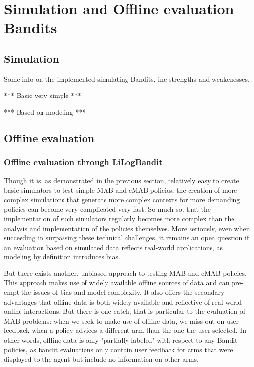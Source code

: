 \documentclass[nojss]{jss}\usepackage[]{graphicx}\usepackage[]{color}
\begin{document}
\begin{center}

\end{center}


\section{Simulation and Offline evaluation Bandits}

\subsection{Simulation}

Some info on the implemented simulating Bandits, inc strengths and weakenesses.

*** Basic very simple ***

*** Based on modeling ***

\subsection{Offline evaluation}

\subsubsection{Offline evaluation through LiLogBandit}

Though it is, as demonstrated in the previous section, relatively easy to create basic simulators to test simple MAB and cMAB policies, the creation of more complex simulations that generate more complex contexts for more demanding policies can become very complicated very fast. So much so, that the implementation of such simulators regularly becomes more complex than the analysis and implementation of the policies themselves. More seriously, even when succeeding in surpassing these technical challenges, it remains an open question if an evaluation based on simulated data reflects real-world applications, as modeling by definition introduces bias.

But there exists another, unbiased approach to testing MAB and cMAB policies. This approach makes use of widely available offline sources of data and can pre-empt the issues of bias and model complexity. It also offers the secondary advantages that offline data is both widely available and reflective of real-world online interactions. But there is one catch, that is particular to the evaluation of MAB problems: when we seek to make use of offline data, we miss out on user feedback when a policy advices a different arm than the one the user selected. In other words, offline data is only "partially labeled" with respect to any Bandit policies, as bandit evaluations only contain user feedback for arms that were displayed to the agent but include no information on other arms.
\end{document}
